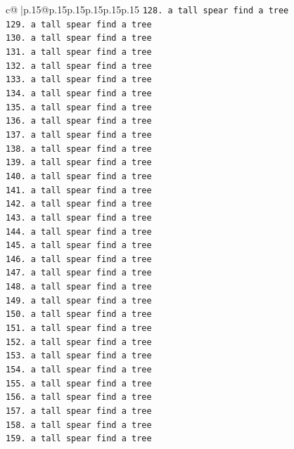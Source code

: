 \documentclass{article}
\begin{document}
{\begin{supertabular}{c@{$\;$}|p{.15\linewidth}@{}p{.15\linewidth}p{.15\linewidth}p{.15\linewidth}p{.15\linewidth}p{.15\linewidth}}
{{{\texttt{128. a tall spear find a tree} \\
\texttt{129. a tall spear find a tree} \\
\texttt{130. a tall spear find a tree} \\
\texttt{131. a tall spear find a tree} \\
\texttt{132. a tall spear find a tree} \\
\texttt{133. a tall spear find a tree} \\
\texttt{134. a tall spear find a tree} \\
\texttt{135. a tall spear find a tree} \\
\texttt{136. a tall spear find a tree} \\
\texttt{137. a tall spear find a tree} \\
\texttt{138. a tall spear find a tree} \\
\texttt{139. a tall spear find a tree} \\
\texttt{140. a tall spear find a tree} \\
\texttt{141. a tall spear find a tree} \\
\texttt{142. a tall spear find a tree} \\
\texttt{143. a tall spear find a tree} \\
\texttt{144. a tall spear find a tree} \\
\texttt{145. a tall spear find a tree} \\
\texttt{146. a tall spear find a tree} \\
\texttt{147. a tall spear find a tree} \\
\texttt{148. a tall spear find a tree} \\
\texttt{149. a tall spear find a tree} \\
\texttt{150. a tall spear find a tree} \\
\texttt{151. a tall spear find a tree} \\
\texttt{152. a tall spear find a tree} \\
\texttt{153. a tall spear find a tree} \\
\texttt{154. a tall spear find a tree} \\
\texttt{155. a tall spear find a tree} \\
\texttt{156. a tall spear find a tree} \\
\texttt{157. a tall spear find a tree} \\
\texttt{158. a tall spear find a tree} \\
\texttt{159. a tall spear find a tree} \\
}}}
\end{supertabular}}
\end{document}

